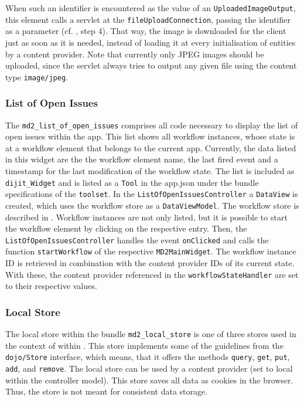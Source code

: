 When such an identifier is encountered as the value of an \lstinline|UploadedImageOutput|, this element calls a servlet at the \lstinline|fileUploadConnection|, passing the identifier as a parameter (cf. , step 4). That way, the image is downloaded for the client just as soon as it is needed, instead of loading it at every initialisation of entities by a content provider. Note that currently only JPEG images should be uploaded, since the servlet always tries to output any given file using the content type \lstinline|image/jpeg|.



\subsubsection{List of Open Issues}
\label{sec:listOfOpenIssues}

The \lstinline!md2_list_of_open_issues! comprises all code necessary to display the list of open issues within the app. This list shows all workflow instances, whose state is at a workflow element that belongs to the current app. Currently, the data listed in this widget are the the workflow element name, the last fired event and a timestamp for the last modification of the workflow state. 
The list is included as \lstinline!dijit_Widget! and is listed as a \lstinline!Tool! in the app.json under the bundle specifications of the \lstinline!toolset!. In the \lstinline!ListOfOpenIssues!\lstinline!Controller! a \lstinline!DataView! is created, which uses the workflow store as a \lstinline!DataViewModel!. The workflow store is described in .
Workflow instances are not only listed, but it is possible to start the workflow element by clicking on the respective entry. Then, the \lstinline!ListOfOpenIssuesController! handles the event \lstinline!onClicked! and calls the function \lstinline!startWorkflow! of the respective \lstinline!MD2MainWidget!. The workflow instance ID is retrieved in combination with the content provider IDs of its current state. With these, the content provider referenced in the \lstinline!workflowStateHandler! are set to their respective values.

\subsubsection{Local Store} \label{local_store}



The local store within the bundle \lstinline|md2_local_store| is one of three stores used in the context of \mapapps within \MD. This store implements some of the guidelines from the \lstinline|dojo/Store| interface, which means, that it offers the methods \lstinline|query|, \lstinline|get|, \lstinline|put|, \lstinline|add|, and \lstinline|remove|.
The local store can be used by a content provider (set to local within the controller model). This store saves all data as cookies in the browser. Thus, the store is not meant for consistent data storage.

